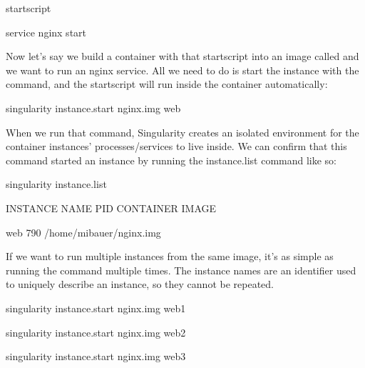 \documentclass[letterpaper,10pt,english]{sphinxmanual}
\begin{document}
%
\begin{sphinxVerbatim}[commandchars=\\\{\}]
\PYGZpc{}startscript


service nginx start
\end{sphinxVerbatim}

Now let’s say we build a container with that startscript into an image
called  and we want to run an nginx service. All we need to do is start
the instance with the {\hyperref[\detokenize{appendix:instance-start}]{}} command, and the
startscript will run inside the container automatically:

%
\begin{sphinxVerbatim}

\PYGZdl{} singularity instance.start   nginx.img  web
\end{sphinxVerbatim}

When we run that command, Singularity creates an isolated environment
for the container instances’ processes/services to live inside. We can
confirm that this command started an instance by running the
instance.list command like so:

%
\begin{sphinxVerbatim}[commandchars=\\\{\}]
\PYGZdl{} singularity instance.list

INSTANCE NAME    PID      CONTAINER IMAGE

web              790      /home/mibauer/nginx.img
\end{sphinxVerbatim}

If we want to run multiple instances from the same image, it’s as simple
as running the command multiple times. The instance names are an
identifier used to uniquely describe an instance, so they cannot be
repeated.

%
\begin{sphinxVerbatim}[commandchars=\\\{\}]
\PYGZdl{} singularity instance.start   nginx.img  web1

\PYGZdl{} singularity instance.start   nginx.img  web2

\PYGZdl{} singularity instance.start   nginx.img  web3
\end{sphinxVerbatim}
\end{document}
